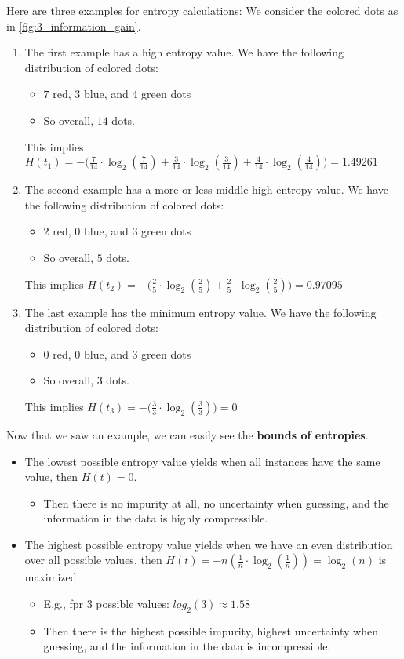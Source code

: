 Here are three examples for entropy calculations: We consider the colored dots as in \ref{fig:3_information_gain}.
\begin{enumerate}
  \item The first example has a high entropy value. We have the following distribution of colored dots: 
  \begin{itemize}
    \item $7$ red, $3$ blue, and $4$ green dots
    \item So overall, $14$ dots.
  \end{itemize}
  This implies $H(t_1)=-\big(
    \frac{7}{14} \cdot \log_2(\frac{7}{14}) + \frac{3}{14} \cdot \log_2(\frac{3}{14}) + \frac{4}{14} \cdot \log_2(\frac{4}{14}) 
  \big) = 1.49261$
  \item The second example has a more or less middle high entropy value. We have the following distribution of colored dots: 
  \begin{itemize}
    \item $2$ red, $0$ blue, and $3$ green dots
    \item So overall, $5$ dots.
  \end{itemize}
  This implies $H(t_2)=-\big(
    \frac{2}{5} \cdot \log_2(\frac{2}{5}) + \frac{2}{5} \cdot \log_2(\frac{2}{5}) 
  \big) = 0.97095$
  \item The last example has the minimum entropy value. We have the following distribution of colored dots: 
  \begin{itemize}
    \item $0$ red, $0$ blue, and $3$ green dots
    \item So overall, $3$ dots.
  \end{itemize}
  This implies $H(t_3)=-\big(
    \frac{3}{3} \cdot \log_2(\frac{3}{3}) 
  \big) = 0$
\end{enumerate}

Now that we saw an example, we can easily see the \textbf{bounds of entropies}.
\begin{itemize}
  \item The lowest possible entropy value yields when all instances have the same value, then $H(t) = 0$.
  \begin{itemize}
    \item Then there is no impurity at all, no uncertainty when guessing, and the information in the data is highly compressible.
  \end{itemize}
  \item The highest possible entropy value yields when we have an even distribution over all possible values, then $H(t) = - n (\frac{1}{n}\cdot \log_2(\frac{1}{n})) = \log_2(n)$ is maximized
  \begin{itemize}
    \item E.g., fpr $3$ possible values: $log_2(3) \approx 1.58$
    \item Then there is the highest possible impurity, highest uncertainty when guessing, and the information in the data is incompressible.
  \end{itemize}
\end{itemize}

